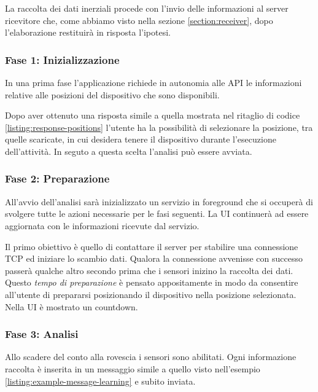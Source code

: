 La raccolta dei dati inerziali procede con l'invio delle informazioni al server ricevitore che, 
come abbiamo visto nella sezione \ref{section:receiver}, dopo l'elaborazione restituirà in risposta l'ipotesi.


\subsubsection{Fase 1: Inizializzazione}
In una prima fase l'applicazione richiede in autonomia alle API le informazioni relative alle posizioni del dispositivo 
che sono disponibili.

Dopo aver ottenuto una risposta simile a quella mostrata nel ritaglio di codice \ref{listing:response-positions}  
l'utente ha la possibilità di selezionare la posizione, tra quelle scaricate, in cui desidera tenere 
il dispositivo durante l'esecuzione dell'attività. In seguto a questa scelta l'analisi può essere avviata.

\subsubsection{Fase 2: Preparazione}
All'avvio dell'analisi sarà inizializzato un servizio in foreground \cite{services} che si occuperà di svolgere tutte le azioni 
necessarie per le fasi seguenti. La UI continuerà ad essere aggiornata con le informazioni ricevute dal servizio.

Il primo obiettivo è quello di contattare il server per stabilire una connessione TCP ed iniziare lo scambio dati. 
Qualora la connessione avvenisse con successo passerà qualche altro secondo prima che i sensori inizino la raccolta dei dati.
Questo \textit{tempo di preparazione} è pensato appositamente in modo da consentire all'utente 
di prepararsi posizionando il dispositivo nella posizione selezionata. Nella UI è mostrato un countdown.

\subsubsection{Fase 3: Analisi}
Allo scadere del conto alla rovescia i sensori sono abilitati. 
Ogni informazione raccolta è inserita in un messaggio simile a quello visto 
nell'esempio \ref{listing:example-message-learning} e subito inviata.


